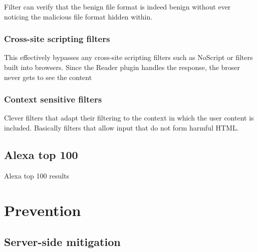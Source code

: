 \documentclass[10pt, conference, compsocconf]{IEEEtran}
\begin{document}
Filter can verify that the benign file format is indeed benign 
without ever noticing the malicious file format hidden within.


\subsubsection{Cross-site scripting filters}

This effectively bypasses any cross-site scripting filters such as 
NoScript or filters built into browsers. Since the Reader plugin 
handles the response, the broser never gets to see the content


\subsubsection{Context sensitive filters}

Clever filters that adapt their filtering to the context in which 
the user content is included. Basically filters that allow input 
that do not form harmful HTML. 


\subsection{Alexa top 100}

Alexa top 100 results












\section{Prevention}


\subsection{Server-side mitigation}
\end{document}
